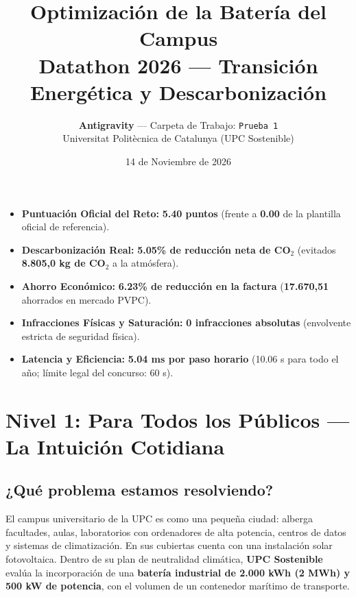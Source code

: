 \documentclass[a4paper,11pt]{article}
\title{\vspace{-1.2cm}\Huge\bfseries\color{azulupc} Optimización de la Batería del Campus\\[0.3cm]
\Large\color{gray}Datathon 2026 — Transición Energética y Descarbonización}
\author{\textbf{Antigravity} — Carpeta de Trabajo: \texttt{Prueba 1}\\[0.1cm]
\small Universitat Politècnica de Catalunya (UPC Sostenible)}
\date{\small 14 de Noviembre de 2026}
\newcommand{\euro}{\text{€}}
\begin{document}
\maketitle
\thispagestyle{fancy}

\begin{tcolorbox}[colback=verdeeco!5!white,colframe=verdeeco,title=SÍNTESIS EJECUTIVA DE RESULTADOS OFICIALES (PSEUDO-TEST 1.725 HORAS)]
\small
\begin{itemize}\setlength\itemsep{1pt}
    \item \textbf{Puntuación Oficial del Reto:} \textbf{\textcolor{verdeeco}{5.40 puntos}} (frente a \textbf{0.00} de la plantilla oficial de referencia).
    \item \textbf{Descarbonización Real:} \textbf{5.05\% de reducción neta de CO$_2$} (evitados \textbf{8.805,0 kg de CO$_2$} a la atmósfera).
    \item \textbf{Ahorro Económico:} \textbf{6.23\% de reducción en la factura} (\textbf{17.670,51 \euro} ahorrados en mercado PVPC).
    \item \textbf{Infracciones Físicas y Saturación:} \textbf{0 infracciones absolutas} (envolvente estricta de seguridad física).
    \item \textbf{Latencia y Eficiencia:} \textbf{5.04 ms por paso horario} (10.06 s para todo el año; límite legal del concurso: 60 s).
\end{itemize}
\end{tcolorbox}

\vspace{0.3cm}

\section{Nivel 1: Para Todos los Públicos — La Intuición Cotidiana}

\subsection{¿Qué problema estamos resolviendo?}
El campus universitario de la UPC es como una pequeña ciudad: alberga facultades, aulas, laboratorios con ordenadores de alta potencia, centros de datos y sistemas de climatización. En sus cubiertas cuenta con una instalación solar fotovoltaica. Dentro de su plan de neutralidad climática, \textbf{UPC Sostenible} evalúa la incorporación de una \textbf{batería industrial de 2.000 kWh (2 MWh) y 500 kW de potencia}, con el volumen de un contenedor marítimo de transporte.
\end{document}
